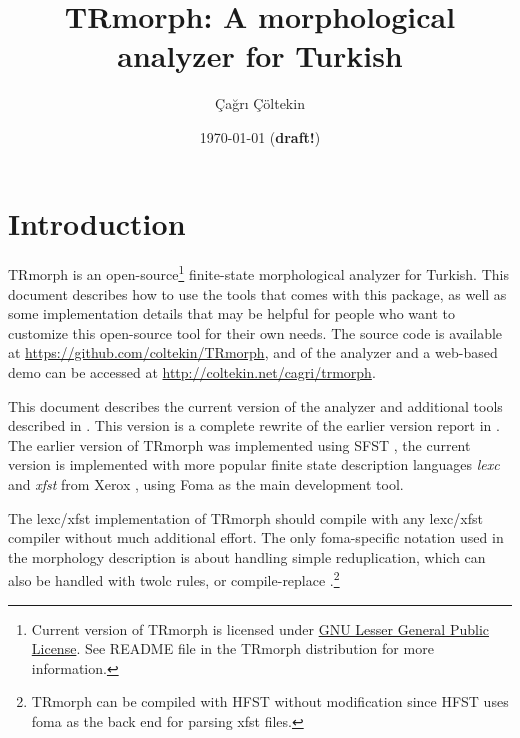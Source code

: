\documentclass[twocolumn]{article}
\title{TRmorph: A morphological analyzer for Turkish}
\author{Çağrı Çöltekin}
\date{\today{} (\textbf{draft!})}
\begin{document}
\twocolumn[
\begin{@twocolumnfalse}
\maketitle
\end{@twocolumnfalse}
]


\section{Introduction}

TRmorph is an open-source\footnote{Current version of TRmorph is
licensed under \href{http://www.gnu.org/licenses/lgpl.html}{GNU Lesser
General Public License}. See README file in the TRmorph distribution
for more information.} finite-state morphological analyzer for
Turkish.  This document describes how to use the tools that comes with
this package, as well as some implementation details that may be
helpful for people who want to customize this open-source tool for
their own needs.
The source code is available at \url{https://github.com/coltekin/TRmorph},
and of  the analyzer and a web-based demo can be accessed at \url{http://coltekin.net/cagri/trmorph}. 

This document describes the current version of the analyzer and additional tools described in \textcite{coltekin2014lrec}.
This version is a complete rewrite of the earlier version report in \textcite{coltekin2010}.  
The earlier version of TRmorph was implemented using SFST \parencite{schmid2005}, 
the current version is implemented with more popular finite state description languages \emph{lexc} and \emph{xfst} from Xerox \parencite{beesley2003}, 
using Foma \parencite{hulden2009} as the main development tool. 

The lexc/xfst implementation of TRmorph should compile with any
lexc/xfst compiler without much additional effort.  The only
foma-specific notation used in the morphology description is about
handling simple reduplication, which can also be handled with twolc
rules, or compile-replace \parencite{beesley2003}.\footnote{TRmorph
can be compiled with HFST \parencite{linden2009} without modification
since HFST uses foma as the back end for parsing xfst files.}
\end{document}
